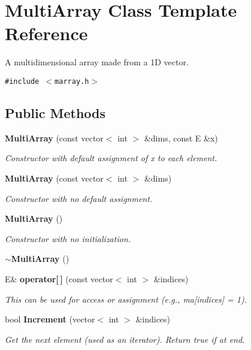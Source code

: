 \section{Multi\-Array  Class Template Reference}
\label{class_MultiArray}
A multidimensional array made from a 1D vector. 


{\tt \#include $<$marray.h$>$}

\subsection*{Public Methods}
\begin{CompactItemize}
\item 
{\bf Multi\-Array} (const vector$<$ int $>$ \&dims, const E \&x)
\begin{CompactList}\small\item\em Constructor with default assignment of x to each element.\item\end{CompactList}\item 
{\bf Multi\-Array} (const vector$<$ int $>$ \&dims)
\begin{CompactList}\small\item\em Constructor with no default assignment.\item\end{CompactList}\item 
{\bf Multi\-Array} ()
\begin{CompactList}\small\item\em Constructor with no initialization.\item\end{CompactList}\item 
{\bf $\sim$Multi\-Array} ()
\item 
E\& {\bf operator[$\,$]} (const vector$<$ int $>$ \&indices)
\begin{CompactList}\small\item\em This can be used for access or assignment (e.g., ma[indices] = 1).\item\end{CompactList}\item 
bool {\bf Increment} (vector$<$ int $>$ \&indices)
\begin{CompactList}\small\item\em Get the next element (used as an iterator). Return true if at end.\item\end{CompactList}\end{CompactItemize}
